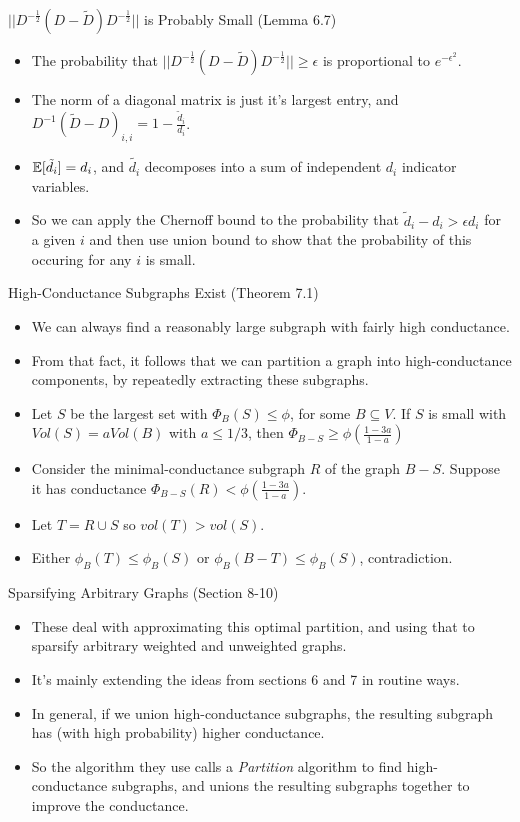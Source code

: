 \documentclass[presentation]{beamer}
\begin{document}
\begin{frame}[label={sec:org39d62aa}]{\(||D^{-\frac12}(D-\tilde{D}) D^{-\frac12}||\) is Probably Small (Lemma 6.7)}
\begin{itemize}
\item The probability that \(||D^{-\frac12}(D-\tilde{D})D^{-\frac12}|| \ge \epsilon\) is proportional to \(e^{-\epsilon^2}\).
\item The norm of a diagonal matrix is just it's largest entry, and \(D^{-1}(\tilde{D}-D)_{i,i}=1-\frac{\tilde{d}_i}{d_i}\).
\item \(\mathbb{E}[\tilde{d}_i]=d_i\), and \(\tilde{d_i}\) decomposes into a sum of independent \(d_i\) indicator variables.
\item So we can apply the Chernoff bound to the probability that \(\tilde{d}_i-d_i > \epsilon d_i\) for a given \(i\) and then use union bound to show that the probability of this occuring for any \(i\) is small.
\end{itemize}
\end{frame}
\begin{frame}[label={sec:org4d5a574}]{High-Conductance Subgraphs Exist (Theorem 7.1)}
\begin{itemize}
\item We can always find a reasonably large subgraph with fairly high conductance.
\item From that fact, it follows that we can partition a graph into high-conductance components, by repeatedly extracting these subgraphs.
\item Let \(S\) be the largest set with \(\Phi_B(S) \le \phi\), for some \(B \subseteq V\). If \(S\) is small with \(Vol(S) = a Vol(B)\) with \(a\le 1/3\), then \(\Phi_{B-S} \ge \phi(\frac{1-3a}{1-a})\)
\item Consider the minimal-conductance subgraph \(R\) of the graph \(B-S\). Suppose it has conductance \(\Phi_{B-S}(R) < \phi (\frac{1-3a}{1-a})\).
\item Let \(T= R \cup S\) so \(vol(T) > vol(S)\).
\item Either \(\phi_B(T) \le \phi_B(S)\) or \(\phi_B(B-T) \le \phi_B(S)\), contradiction.
\end{itemize}
\end{frame}
\begin{frame}[label={sec:org7ac74f5}]{Sparsifying Arbitrary Graphs (Section 8-10)}
\begin{itemize}
\item These deal with approximating this optimal partition, and using that to sparsify arbitrary weighted and unweighted graphs.
\item It's mainly extending the ideas from sections 6 and 7 in routine ways.
\item In general, if we union high-conductance subgraphs, the resulting subgraph has (with high probability) higher conductance.
\item So the algorithm they use calls a \emph{Partition} algorithm to find high-conductance subgraphs, and unions the resulting subgraphs together to improve the conductance.
\end{itemize}
\end{frame}
\end{document}
